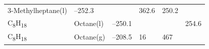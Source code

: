 \documentclass[
  9pt,
]{extbook}
\theoremstyle{definition}
\theoremstyle{definition}
\theoremstyle{definition}
\theoremstyle{remark}
\begin{document}
\begin{longtable}[]{@{}llllll@{}}
\begin{minipage}[t]{0.17\columnwidth}
3-Methylheptane(l)\strut
\end{minipage} & \begin{minipage}[t]{0.15\columnwidth}\raggedright
--252.3\strut
\end{minipage} & \begin{minipage}[t]{0.15\columnwidth}\raggedright
\strut
\end{minipage} & \begin{minipage}[t]{0.14\columnwidth}\raggedright
362.6\strut
\end{minipage} & \begin{minipage}[t]{0.14\columnwidth}\raggedright
250.2\strut
\end{minipage}\tabularnewline
\begin{minipage}[t]{0.07\columnwidth}\raggedright
C\textsubscript{8}H\textsubscript{18}\strut
\end{minipage} & \begin{minipage}[t]{0.17\columnwidth}\raggedright
Octane(l)\strut
\end{minipage} & \begin{minipage}[t]{0.15\columnwidth}\raggedright
--250.1\strut
\end{minipage} & \begin{minipage}[t]{0.15\columnwidth}\raggedright
\strut
\end{minipage} & \begin{minipage}[t]{0.14\columnwidth}\raggedright
\strut
\end{minipage} & \begin{minipage}[t]{0.14\columnwidth}\raggedright
254.6\strut
\end{minipage}\tabularnewline
\begin{minipage}[t]{0.07\columnwidth}\raggedright
C\textsubscript{8}H\textsubscript{18}\strut
\end{minipage} & \begin{minipage}[t]{0.17\columnwidth}\raggedright
Octane(g)\strut
\end{minipage} & \begin{minipage}[t]{0.15\columnwidth}\raggedright
--208.5\strut
\end{minipage} & \begin{minipage}[t]{0.15\columnwidth}\raggedright
16\strut
\end{minipage} & \begin{minipage}[t]{0.14\columnwidth}\raggedright
467\strut
\end{minipage} & \begin{minipage}[t]{0.14\columnwidth}\raggedright

\end{minipage}
\end{longtable}
\end{document}
